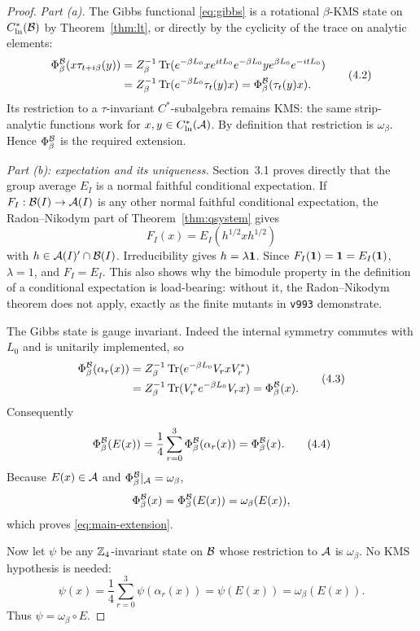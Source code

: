 \begin{proof}
\emph{Part (a).}
The Gibbs functional \eqref{eq:gibbs} is a rotational
$\beta$-KMS state on $C^*_{\mathrm{ln}}(\mathcal B)$ by
Theorem~\ref{thm:lt}, or directly by the cyclicity of the trace on
analytic elements:
\[
\begin{aligned}
 \Phi_\beta^{\mathcal B}(x\tau_{t+i\beta}(y))
 &=Z_\beta^{-1}
   \operatorname{Tr}(e^{-\beta L_0}x e^{itL_0}e^{-\beta L_0}
        y e^{\beta L_0}e^{-itL_0})\\
 &=Z_\beta^{-1}
   \operatorname{Tr}(e^{-\beta L_0}\tau_t(y)x)
 =\Phi_\beta^{\mathcal B}(\tau_t(y)x).
\end{aligned}
\tag{4.2}\label{eq:gibbs-kms}
\]
Its restriction to a $\tau$-invariant $C^*$-subalgebra remains KMS:
the same strip-analytic functions work for $x,y\in
C^*_{\mathrm{ln}}(\mathcal A)$.  By definition that restriction is
$\omega_\beta$.  Hence $\Phi_\beta^{\mathcal B}$ is the required extension.

\emph{Part (b): expectation and its uniqueness.}
Section~3.1 proves directly that the group average $E_I$ is a normal
faithful conditional expectation.  If $F_I:\mathcal B(I)\to\mathcal A(I)$ is any
other normal faithful conditional expectation, the
Radon--Nikodym part of Theorem~\ref{thm:qsystem} gives
\[
 F_I(x)=E_I(h^{1/2}xh^{1/2})
\]
with $h\in\mathcal A(I)'\cap\mathcal B(I)$.  Irreducibility gives
$h=\lambda\mathbf 1$.  Since $F_I(\mathbf 1)=\mathbf 1=E_I(\mathbf 1)$, $\lambda=1$, and
$F_I=E_I$.  This also shows why the bimodule property in the
definition of a conditional expectation is load-bearing: without
it, the Radon--Nikodym theorem does not apply, exactly as the
finite mutants in \texttt{v993} demonstrate.

The Gibbs state is gauge invariant.  Indeed the internal symmetry
commutes with $L_0$ and is unitarily implemented, so
\[
\begin{aligned}
 \Phi_\beta^{\mathcal B}(\alpha_r(x))
 &=Z_\beta^{-1}\operatorname{Tr}(e^{-\beta L_0}V_rxV_r^*)\\
 &=Z_\beta^{-1}\operatorname{Tr}(V_r^*e^{-\beta L_0}V_rx)
 =\Phi_\beta^{\mathcal B}(x).
\end{aligned}
\tag{4.3}\label{eq:gauge-invariance}
\]
Consequently
\[
 \Phi_\beta^{\mathcal B}(E(x))
 =\frac14\sum_{r=0}^{3}\Phi_\beta^{\mathcal B}(\alpha_r(x))
 =\Phi_\beta^{\mathcal B}(x).
\tag{4.4}\label{eq:E-preserves}
\]
Because $E(x)\in\mathcal A$ and
$\Phi_\beta^{\mathcal B}|_{\mathcal A}=\omega_\beta$,
\[
 \Phi_\beta^{\mathcal B}(x)
 =\Phi_\beta^{\mathcal B}(E(x))
 =\omega_\beta(E(x)),
\]
which proves \eqref{eq:main-extension}.

Now let $\psi$ be any $\mathbb Z_4$-invariant state on $\mathcal B$ whose restriction
to $\mathcal A$ is $\omega_\beta$.  No KMS hypothesis is needed:
\[
 \psi(x)
 =\frac14\sum_{r=0}^{3}\psi(\alpha_r(x))
 =\psi(E(x))
 =\omega_\beta(E(x)).
\tag{4.5}\label{eq:inv-unique}
\]
Thus $\psi=\omega_\beta\circ E$.


\end{proof}
